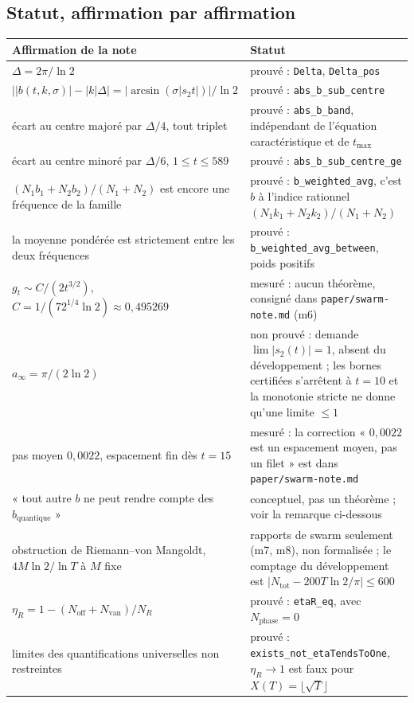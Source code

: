 \documentclass[11pt,a4paper]{article}
\newcommand{\lb}{\_\allowbreak}
\newcommand{\code}[1]{\texttt{#1}}
\theoremstyle{definition}
\theoremstyle{remark}
\begin{document}
\subsection{Statut, affirmation par affirmation}
\begingroup\small
\begin{longtable}{@{}p{6.1cm}p{9.0cm}@{}}
\toprule
\textbf{Affirmation de la note} & \textbf{Statut} \\
\midrule\endhead
$\Delta = 2\pi/\ln 2$ & prouvé : \code{Delta}, \code{Delta\lb{}pos} \\
$\lvert\lvert b(t,k,\sigma)\rvert - \lvert k\rvert\Delta\rvert = \lvert\arcsin(\sigma\lvert s_2 t\rvert)\rvert/\ln 2$ & prouvé : \code{abs\lb{}b\lb{}sub\lb{}centre} \\
écart au centre majoré par $\Delta/4$, tout triplet & prouvé : \code{abs\lb{}b\lb{}band}, indépendant de l'équation caractéristique et de $t_{\max}$ \\
écart au centre minoré par $\Delta/6$, $1 \le t \le 589$ & prouvé : \code{abs\lb{}b\lb{}sub\lb{}centre\lb{}ge} \\
$(N_1b_1 + N_2b_2)/(N_1 + N_2)$ est encore une fréquence de la famille & prouvé : \code{b\lb{}weighted\lb{}avg}, c'est $b$ à l'indice rationnel $(N_1k_1 + N_2k_2)/(N_1 + N_2)$ \\
la moyenne pondérée est strictement entre les deux fréquences & prouvé : \code{b\lb{}weighted\lb{}avg\lb{}between}, poids positifs \\
$g_t \sim C/(2t^{3/2})$, $C = 1/(72^{1/4}\ln 2) \approx 0{,}495269$ & mesuré : aucun théorème, consigné dans \code{paper/swarm-note.md} (m6) \\
$a_\infty = \pi/(2\ln 2)$ & non prouvé : demande $\lim \lvert s_2(t)\rvert = 1$, absent du développement ; les bornes certifiées s'arrêtent à $t = 10$ et la monotonie stricte ne donne qu'une limite $\le 1$ \\
pas moyen $0{,}0022$, espacement fin dès $t = 15$ & mesuré : la correction « $0{,}0022$ est un espacement moyen, pas un filet » est dans \code{paper/swarm-note.md} \\
« tout autre $b$ ne peut rendre compte des $b_{\mathrm{quantique}}$ » & conceptuel, pas un théorème ; voir la remarque ci-dessous \\
obstruction de Riemann--von Mangoldt, $4M\ln 2/\ln T$ à $M$ fixe & rapports de swarm seulement (m7, m8), non formalisée ; le comptage du développement est $\lvert N_{\mathrm{tot}} - 200T\ln 2/\pi\rvert \le 600$ \\
$\eta_R = 1 - (N_{\mathrm{off}} + N_{\mathrm{van}})/N_R$ & prouvé : \code{etaR\lb{}eq}, avec $N_{\mathrm{phase}} = 0$ \\
limites des quantifications universelles non restreintes & prouvé : \code{exists\lb{}not\lb{}etaTendsToOne}, $\eta_R \to 1$ est faux pour $X(T) = \lfloor\sqrt{T}\rfloor$ \\
\bottomrule
\end{longtable}\endgroup
\end{document}
